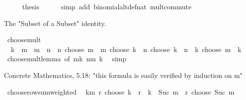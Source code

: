 \begin{isabellebody}
\ \ \isamarkupfalse%
\ \isamarkupfalse%
\ {\isacharquery}{\kern0pt}thesis\isanewline
\ \ \ \ \isamarkupfalse%
\ {\isacharparenleft}{\kern0pt}simp\ add{\isacharcolon}{\kern0pt}\ binomial{\isacharunderscore}{\kern0pt}altdef{\isacharunderscore}{\kern0pt}nat\ mult{\isachardot}{\kern0pt}commute{\isacharparenright}{\kern0pt}\isanewline
{}\isamarkupfalse%
%
\endisatagproof
{\isafoldproof}%
%
\isadelimproof
%
\endisadelimproof
%
\begin{isamarkuptext}%
The "Subset of a Subset" identity.%
\end{isamarkuptext}\isamarkuptrue%
\isamarkupfalse%
\ choose{\isacharunderscore}{\kern0pt}mult{\isacharcolon}{\kern0pt}\isanewline
\ \ {\isachardoublequoteopen}k\ {\isasymle}\ m\ {\isasymLongrightarrow}\ m\ {\isasymle}\ n\ {\isasymLongrightarrow}\ {\isacharparenleft}{\kern0pt}n\ choose\ m{\isacharparenright}{\kern0pt}\ {\isacharasterisk}{\kern0pt}\ {\isacharparenleft}{\kern0pt}m\ choose\ k{\isacharparenright}{\kern0pt}\ {\isacharequal}{\kern0pt}\ {\isacharparenleft}{\kern0pt}n\ choose\ k{\isacharparenright}{\kern0pt}\ {\isacharasterisk}{\kern0pt}\ {\isacharparenleft}{\kern0pt}{\isacharparenleft}{\kern0pt}n\ {\isacharminus}{\kern0pt}\ k{\isacharparenright}{\kern0pt}\ choose\ {\isacharparenleft}{\kern0pt}m\ {\isacharminus}{\kern0pt}\ k{\isacharparenright}{\kern0pt}{\isacharparenright}{\kern0pt}{\isachardoublequoteclose}\isanewline
%
\isadelimproof
\ \ %
\endisadelimproof
%
\isatagproof
{}\isamarkupfalse%
\ choose{\isacharunderscore}{\kern0pt}mult{\isacharunderscore}{\kern0pt}lemma\ {\isacharbrackleft}{\kern0pt}of\ {\isachardoublequoteopen}m{\isacharminus}{\kern0pt}k{\isachardoublequoteclose}\ {\isachardoublequoteopen}n{\isacharminus}{\kern0pt}m{\isachardoublequoteclose}\ k{\isacharbrackright}{\kern0pt}\ \isamarkupfalse%
\ simp%
\endisatagproof
{\isafoldproof}%
%
\isadelimproof
%
\endisadelimproof
%
\begin{isamarkuptext}%
Concrete Mathematics, 5.18: "this formula is easily verified by induction on m"%
\end{isamarkuptext}\isamarkuptrue%
\isamarkupfalse%
\ choose{\isacharunderscore}{\kern0pt}row{\isacharunderscore}{\kern0pt}sum{\isacharunderscore}{\kern0pt}weighted{\isacharcolon}{\kern0pt}\isanewline
\ \ {\isachardoublequoteopen}{\isacharparenleft}{\kern0pt}{\isasymSum}k{\isasymle}m{\isachardot}{\kern0pt}\ {\isacharparenleft}{\kern0pt}r\ choose\ k{\isacharparenright}{\kern0pt}\ {\isacharasterisk}{\kern0pt}\ {\isacharparenleft}{\kern0pt}r{\isacharslash}{\kern0pt}{}\ {\isacharminus}{\kern0pt}\ k{\isacharparenright}{\kern0pt}{\isacharparenright}{\kern0pt}\ {\isacharequal}{\kern0pt}\ {\isacharparenleft}{\kern0pt}Suc\ m{\isacharparenright}{\kern0pt}{\isacharslash}{\kern0pt}{}\ {\isacharasterisk}{\kern0pt}\ {\isacharparenleft}{\kern0pt}r\ choose\ {\isacharparenleft}{\kern0pt}Suc\ m{\isacharparenright}{\kern0pt}{\isacharparenright}{\kern0pt}{\isachardoublequoteclose}\isanewline

\end{isabellebody}
